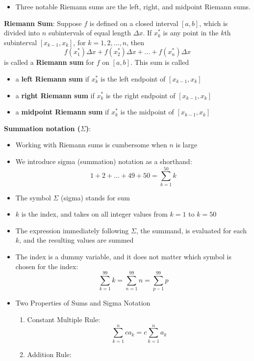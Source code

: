 \documentclass{article}
\begin{document}
\begin{itemize}
\begin{itemize}
        \item Three notable Riemann sums are the left, right, and midpoint Riemann sums.
    \end{itemize}
    \textbf{Riemann Sum}: Suppose $f$ is defined on a closed interval $[a,b]$, which is divided into $n$ subintervals of equal length $\Delta x$. If $x_k^*$ is any point in the $k$th subinterval $[x_{k - 1}, x_k]$, for $k = 1,2,...,n$, then
        $$f(x_1^*)\Delta x + f(x_2^*)\Delta x + ... + f(x_n^*)\Delta x$$
    is called a \textbf{Riemann sum} for $f$ on $[a,b]$. This sum is called
        \begin{itemize}
            \item a \textbf{left Riemann sum} if $x_k^*$ is the left endpoint of $[x_{k - 1}, x_k]$
            \item a \textbf{right Riemann sum} if $x_k^*$ is the right endpoint of $[x_{k - 1}, x_k]$
            \item a \textbf{midpoint Riemann sum} if $x_k^*$ is the midpoint of $[x_{k - 1}, x_k]$
        \end{itemize}
    \textbf{Summation notation ($\Sigma$)}:
        \begin{itemize}
            \item Working with Riemann sums is cumbersome when $n$ is large
            \item We introduce sigma (summation) notation as a shorthand:
                $$1 + 2 + ... + 49 + 50 = \sum_{k = 1}^{50}{k}$$
            \item The symbol $\Sigma$ (sigma) stands for sum
            \item $k$ is the index, and takes on all integer values from $k = 1$ to $k = 50$
            \item The expression immediately following $\Sigma$, the summand, is evaluated for each $k$, and the resulting values are summed
            \item The index is a dummy variable, and it does not matter which symbol is chosen for the index:
                $$\sum_{k = 1}^{99}{k} = \sum_{n = 1}^{99}{n} = \sum_{p - 1}^{99}{p}$$
            \item Two Properties of Sums and Sigma Notation
                \begin{enumerate}
                    \item Constant Multiple Rule:
                        $$\sum_{k = 1}^{n}{ca_k} = c\sum_{k = 1}^{n}{a_k}$$
                    \item Addition Rule:

\end{enumerate}
\end{itemize}
\end{itemize}
\end{document}
